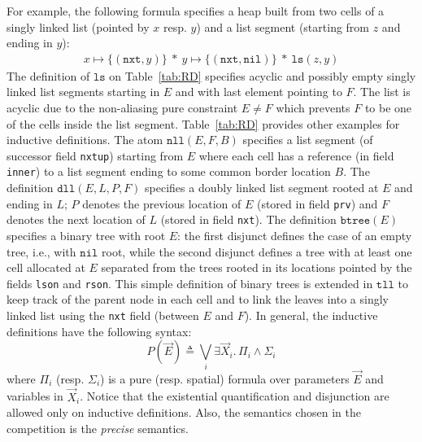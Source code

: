 \documentclass[twoside,11pt]{article}
\newcommand{\sep}{.\,}
\newcommand{\posep}{*}
\newcommand{\points}{\mapsto}
\newcommand{\nil}{\mathtt{nil}}
\newcommand{\ls}{\mathtt{ls}}
\newcommand{\dll}{\mathtt{dll}}
\newcommand{\nll}{\mathtt{nll}}
\begin{document}
For example, the following formula specifies a heap built from two cells of a singly linked list
(pointed by $x$ resp. $y$) and a list segment (starting from $z$ and ending in $y$):
\begin{align}
x \points \{(\texttt{nxt},y)\} \ \posep\ y \points \{(\texttt{nxt},\nil)\} \ \posep\ \ls(z,y)
\end{align}
The definition of $\ls$ on Table~\ref{tab:RD} specifies acyclic and possibly empty singly linked list segments starting in $E$ and with last element pointing to $F$.
The list is acyclic due to the non-aliasing pure constraint $E\neq F$ which prevents $F$ to be one of the cells inside the list segment.
%
Table~\ref{tab:RD} provides other examples for inductive definitions.
%
The atom $\nll(E,F,B)$ specifies a list segment (of successor field \texttt{nxtup}) starting from $E$ where each cell has a reference (in field \texttt{inner}) to a list segment ending to some common border location $B$. 
%
The definition $\dll(E,L,P,F)$ specifies a doubly linked list segment rooted at $E$ and ending in $L$; $P$ denotes the previous location of $E$ (stored in field \texttt{prv}) and $F$ denotes the next location of $L$  (stored in field \texttt{nxt}).
%
The definition $\mathtt{btree}(E)$ specifies a binary tree with root $E$:
the first disjunct defines the case of an empty tree, i.e., with $\nil$ root, while the second disjunct defines a tree with at least one cell allocated at $E$ separated from the trees rooted in its locations pointed by the fields \texttt{lson} and \texttt{rson}.
%
This simple definition of binary trees is extended in $\mathtt{tll}$ to keep track of the parent node in each cell and to link the leaves into a singly linked list using the \texttt{nxt} field (between $E$ and $F$).
%
In general, the inductive definitions have the following syntax:
\begin{equation}\label{eq:RD}
P(\vec{E}) \triangleq \bigvee_i \exists \vec{X}_i\sep \Pi_i \land \Sigma_i
\end{equation}
\noindent where $\Pi_i$ (resp. $\Sigma_i$) is a pure (resp. spatial) formula over parameters $\vec{E}$ and variables in $\vec{X}_i$.
Notice that the existential quantification and disjunction are allowed only on inductive definitions. 
Also, the semantics chosen in the competition is the \emph{precise} semantics.
\end{document}
